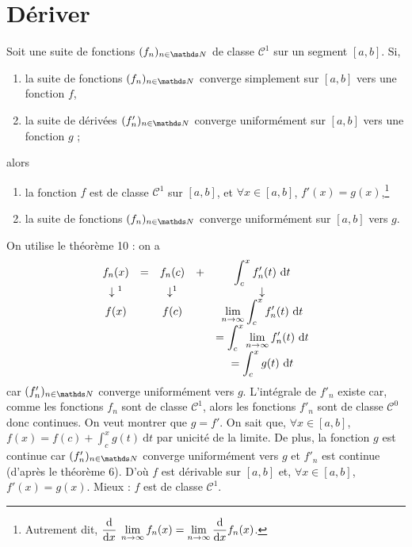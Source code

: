 \section{Dériver}

\begin{thm}
	Soit une suite de fonctions $(f_n)_{n\in\N}$\/ de classe {\color{red}$\mathscr{C}^1$\/} sur un segment $[a,b]$. Si,
	\begin{enumerate}
		\item la suite de fonctions $(f_n)_{n\in\N}$\/ converge simplement sur $[a,b]$\/ vers une fonction $f$,
		\item la suite de dérivées $(f'_n)_{n\in\N}$\/ converge uniformément sur $[a,b]$\/ vers une fonction $g$\/ ;
	\end{enumerate}
	alors
	\begin{enumerate}
		\item la fonction $f$\/ est de classe $\mathscr{C}^1$\/ sur $[a,b]$, et $\forall x \in [a,b]$, $f'(x) = g(x)$,\footnote{Autrement dit, $\displaystyle\frac{\mathrm{d}}{\mathrm{d}x}\:\lim_{n\to \infty} f_n(x) = \lim_{n\to \infty} \frac{\mathrm{d}}{\mathrm{d}x} f_n(x)$.}
		\item la suite de fonctions $(f_n)_{n\in\N}$\/ converge uniformément sur $[a,b]$\/ vers $g$.
	\end{enumerate}
\end{thm}

\begin{prv}
	On utilise le théorème 10 : on a \[
		\begin{array}{c c c c c}
			\ds f_n(x) &=& \ds f_n(c) &+& \ds\int_{c}^{x} f'_n(t)~\mathrm{d}t\\
			\downarrow\footnotemark && \downarrow^\thefootnote && \downarrow\\
			f(x) && f(c) && \ds\lim_{n\to \infty} \int_{c}^{x} f'_n(t)~\mathrm{d}t\\
					 &&&&\ds= \int_{c}^{x} \lim_{n\to \infty} f'_n(t)~\mathrm{d}t\\
					 &&&&\ds= \int_{c}^{x} g(t)~\mathrm{d}t
		\end{array}
	\] car $(f'_n)_{n\in\N}$\/ converge uniformément vers $g$. L'intégrale de $f'_n$\/ existe car, comme les fonctions $f_n$\/ sont de classe $\mathscr{C}^1$, alors les fonctions $f'_n$\/ sont de classe $\mathscr{C}^0$ donc continues.
	On veut montrer que $g = f'$. On sait que, $\forall x \in [a,b]$, $f(x) = f(c) + \int_{c}^{x} g(t)~\mathrm{d}t$\/ par unicité de la limite. De plus, la fonction $g$\/ est continue car $(f'_n)_{n\in\N}$\/ converge uniformément vers $g$\/ et $f'_n$\/ est continue (d'après le théorème 6).
	D'où $f$\/ est dérivable sur $[a,b]$\/ et, $\forall x \in [a,b]$, $f'(x) = g(x)$.
	Mieux : $f$\/ est de classe $\mathscr{C}^1$.
\end{prv}

